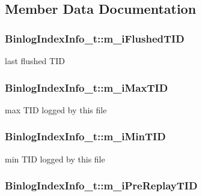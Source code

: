 \subsection{Member Data Documentation}
\hypertarget{structBinlogIndexInfo__t_a92a6e7433836ca0391ad5cc248a6259f}{
\subsubsection[{m\-\_\-i\-Flushed\-T\-I\-D}]{ Binlog\-Index\-Info\-\_\-t\-::m\-\_\-i\-Flushed\-T\-I\-D}}\label{structBinlogIndexInfo__t_a92a6e7433836ca0391ad5cc248a6259f}


last flushed T\-I\-D 

\hypertarget{structBinlogIndexInfo__t_a0e3e8fc820c96e114def961d985192f6}{
\subsubsection[{m\-\_\-i\-Max\-T\-I\-D}]{ Binlog\-Index\-Info\-\_\-t\-::m\-\_\-i\-Max\-T\-I\-D}}\label{structBinlogIndexInfo__t_a0e3e8fc820c96e114def961d985192f6}


max T\-I\-D logged by this file 

\hypertarget{structBinlogIndexInfo__t_a506a22d43cfe9c16bb358afb583fc1c2}{
\subsubsection[{m\-\_\-i\-Min\-T\-I\-D}]{ Binlog\-Index\-Info\-\_\-t\-::m\-\_\-i\-Min\-T\-I\-D}}\label{structBinlogIndexInfo__t_a506a22d43cfe9c16bb358afb583fc1c2}


min T\-I\-D logged by this file 

\hypertarget{structBinlogIndexInfo__t_a4a8661a7f79a3e872e97f301876bff67}{
\subsubsection[{m\-\_\-i\-Pre\-Replay\-T\-I\-D}]{ Binlog\-Index\-Info\-\_\-t\-::m\-\_\-i\-Pre\-Replay\-T\-I\-D}}\label{structBinlogIndexInfo__t_a4a8661a7f79a3e872e97f301876bff67}


